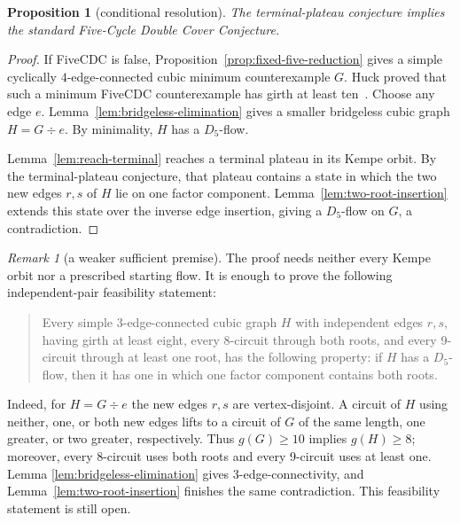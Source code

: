 \documentclass[11pt]{article}
\newtheorem{proposition}[theorem]{Proposition}
\theoremstyle{definition}
\theoremstyle{remark}
\newtheorem{remark}[theorem]{Remark}
\begin{document}
\begin{proposition}[conditional resolution]\label{prop:conditional-resolution}
The terminal-plateau conjecture implies the standard Five-Cycle Double
Cover Conjecture.
\end{proposition}

\begin{proof}
If FiveCDC is false, Proposition~\ref{prop:fixed-five-reduction} gives a
simple cyclically \(4\)-edge-connected cubic minimum counterexample
\(G\).  Huck proved
that such a minimum FiveCDC counterexample has girth at least
ten~\cite{Huck2000}.  Choose any edge \(e\).
Lemma~\ref{lem:bridgeless-elimination} gives a smaller bridgeless cubic
graph \(H=G\div e\).  By minimality, \(H\) has a \(D_5\)-flow.

Lemma~\ref{lem:reach-terminal} reaches a terminal plateau in its Kempe
orbit.  By the terminal-plateau conjecture, that plateau contains a
state in which the two new edges \(r,s\) of \(H\) lie on one factor
component.  Lemma~\ref{lem:two-root-insertion} extends this state over
the inverse edge insertion, giving a \(D_5\)-flow on \(G\), a
contradiction.
\end{proof}

\begin{remark}[a weaker sufficient premise]\label{rem:weaker-premise}
The proof needs neither every Kempe orbit nor a prescribed starting
flow.  It is enough to prove the following independent-pair feasibility
statement:

\begin{quote}
Every simple \(3\)-edge-connected cubic graph \(H\) with independent
edges \(r,s\), having girth at least eight, every 8-circuit through both
roots, and every 9-circuit through at least one root, has the following
property: if \(H\) has a \(D_5\)-flow, then it has one in which one
factor component contains both roots.
\end{quote}

Indeed, for \(H=G\div e\) the new edges \(r,s\) are vertex-disjoint.  A
circuit of \(H\) using neither, one, or both new edges lifts to a circuit
of \(G\) of the same length, one greater, or two greater, respectively.
Thus \(g(G)\ge10\) implies \(g(H)\ge8\); moreover, every 8-circuit uses
both roots and every 9-circuit uses at least one.  Lemma
\ref{lem:bridgeless-elimination} gives 3-edge-connectivity, and
Lemma~\ref{lem:two-root-insertion} finishes the same contradiction.
This feasibility statement is still open.
\end{remark}
\end{document}
